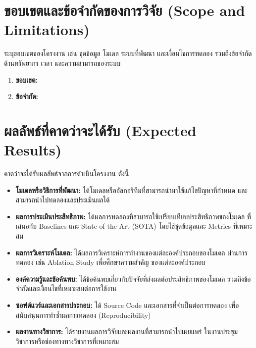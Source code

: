 \documentclass[20pt,a4paper]{article}
\begin{document}
\section{ขอบเขตและข้อจำกัดของการวิจัย
(Scope and Limitations)}

ระบุขอบเขตของโครงงาน เช่น ชุดข้อมูล โมเดล ระบบที่พัฒนา
และเงื่อนไขการทดลอง รวมถึงข้อจำกัดด้านทรัพยากร เวลา
และความสามารถของระบบ

\begin{enumerate}
    \item \textbf{ขอบเขต:} \dotfill
    \item \textbf{ข้อจำกัด:} \dotfill
\end{enumerate}


\section{ผลลัพธ์ที่คาดว่าจะได้รับ (Expected Results)}

คาดว่าจะได้รับผลลัพธ์จากการดำเนินโครงงาน ดังนี้

\begin{itemize}

    \item \textbf{โมเดลหรือวิธีการที่พัฒนา:}
    ได้โมเดลหรืออัลกอริทึมที่สามารถนำมาใช้แก้ไขปัญหาที่กำหนด
    และสามารถนำไปทดลองและประเมินผลได้

    \item \textbf{ผลการประเมินประสิทธิภาพ:}
    ได้ผลการทดลองที่สามารถใช้เปรียบเทียบประสิทธิภาพของโมเดล
    ที่เสนอกับ Baselines และ State-of-the-Art (SOTA)
    โดยใช้ชุดข้อมูลและ Metrics ที่เหมาะสม

    \item \textbf{ผลการวิเคราะห์โมเดล:}
    ได้ผลการวิเคราะห์การทำงานของแต่ละองค์ประกอบของโมเดล
    ผ่านการทดลอง เช่น Ablation Study เพื่อศึกษาความสำคัญ
    ของแต่ละองค์ประกอบ

    \item \textbf{องค์ความรู้และข้อค้นพบ:}
    ได้ข้อค้นพบเกี่ยวกับปัจจัยที่ส่งผลต่อประสิทธิภาพของโมเดล
    รวมถึงข้อจำกัดและเงื่อนไขที่เหมาะสมต่อการใช้งาน

    \item \textbf{ซอฟต์แวร์และเอกสารประกอบ:}
    ได้ Source Code และเอกสารที่จำเป็นต่อการทดลอง
    เพื่อสนับสนุนการทำซ้ำผลการทดลอง (Reproducibility)

    \item \textbf{ผลงานทางวิชาการ:}
    ได้รายงานผลการวิจัยและผลงานที่สามารถนำไปเผยแพร่
    ในงานประชุมวิชาการหรือช่องทางทางวิชาการที่เหมาะสม

\end{itemize}
\end{document}
